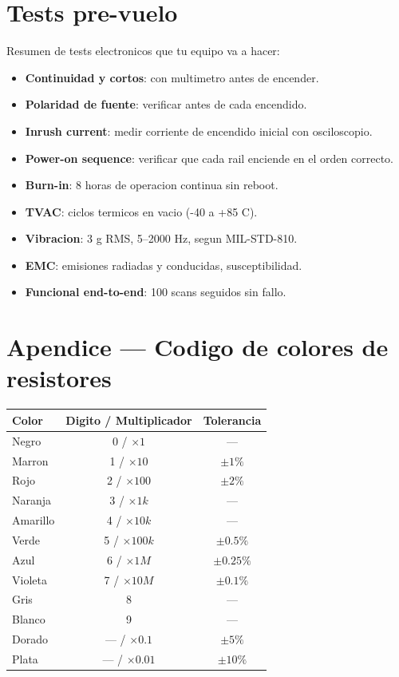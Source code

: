 \documentclass[11pt,a4paper,oneside,openright]{book}
\begin{document}
\chapter{Tests pre-vuelo}

Resumen de tests electronicos que tu equipo va a hacer:

\begin{itemize}[leftmargin=2em]
  \item \textbf{Continuidad y cortos}: con multimetro antes de encender.
  \item \textbf{Polaridad de fuente}: verificar antes de cada encendido.
  \item \textbf{Inrush current}: medir corriente de encendido inicial con osciloscopio.
  \item \textbf{Power-on sequence}: verificar que cada rail enciende en el orden correcto.
  \item \textbf{Burn-in}: 8 horas de operacion continua sin reboot.
  \item \textbf{TVAC}: ciclos termicos en vacio (-40 a +85 C).
  \item \textbf{Vibracion}: 3 g RMS, 5--2000 Hz, segun MIL-STD-810.
  \item \textbf{EMC}: emisiones radiadas y conducidas, susceptibilidad.
  \item \textbf{Funcional end-to-end}: 100 scans seguidos sin fallo.
\end{itemize}

\appendix
\chapter{Apendice --- Codigo de colores de resistores}

\begin{center}
\begin{tabular}{lcc}
\toprule
\textbf{Color} & \textbf{Digito / Multiplicador} & \textbf{Tolerancia} \\
\midrule
Negro    & 0 / $\times 1$        & --- \\
Marron   & 1 / $\times 10$       & $\pm 1\%$ \\
Rojo     & 2 / $\times 100$      & $\pm 2\%$ \\
Naranja  & 3 / $\times 1k$       & --- \\
Amarillo & 4 / $\times 10k$      & --- \\
Verde    & 5 / $\times 100k$     & $\pm 0.5\%$ \\
Azul     & 6 / $\times 1M$       & $\pm 0.25\%$ \\
Violeta  & 7 / $\times 10M$      & $\pm 0.1\%$ \\
Gris     & 8                      & --- \\
Blanco   & 9                      & --- \\
Dorado   & --- / $\times 0.1$    & $\pm 5\%$ \\
Plata    & --- / $\times 0.01$   & $\pm 10\%$ \\
\bottomrule
\end{tabular}
\end{center}
\end{document}

